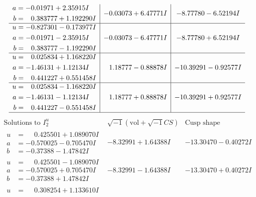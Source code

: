 \documentclass[1p]{elsarticle_modified}
\theoremstyle{definition}
\newcommand{\I}{\sqrt{-1}}
\begin{document}
$$\begin{array}{c|c|c}
\begin{aligned}
a &= -0.01971 + 2.35915 I \\
b &= \phantom{-}0.383777 + 1.192290 I\end{aligned}
 & -0.03073 + 6.47771 I & -8.77780 - 6.52194 I \\ \hline\begin{aligned}
u &= -0.827301 - 0.173977 I \\
a &= -0.01971 - 2.35915 I \\
b &= \phantom{-}0.383777 - 1.192290 I\end{aligned}
 & -0.03073 - 6.47771 I & -8.77780 + 6.52194 I \\ \hline\begin{aligned}
u &= \phantom{-}0.025834 + 1.168220 I \\
a &= -1.46131 + 1.12134 I \\
b &= \phantom{-}0.441227 + 0.551458 I\end{aligned}
 & \phantom{-}1.18777 - 0.88878 I & -10.39291 - 0.92577 I \\ \hline\begin{aligned}
u &= \phantom{-}0.025834 - 1.168220 I \\
a &= -1.46131 - 1.12134 I \\
b &= \phantom{-}0.441227 - 0.551458 I\end{aligned}
 & \phantom{-}1.18777 + 0.88878 I & -10.39291 + 0.92577 I\\
 \hline 
 \end{array}$$\newpage$$\begin{array}{c|c|c}  
\text{Solutions to }I^u_{2}& \I (\text{vol} + \sqrt{-1}CS) & \text{Cusp shape}\\
 \hline 
\begin{aligned}
u &= \phantom{-}0.425501 + 1.089070 I \\
a &= -0.570025 - 0.705470 I \\
b &= -0.37388 - 1.47842 I\end{aligned}
 & -8.32991 + 1.64388 I & -13.30470 - 0.40272 I \\ \hline\begin{aligned}
u &= \phantom{-}0.425501 - 1.089070 I \\
a &= -0.570025 + 0.705470 I \\
b &= -0.37388 + 1.47842 I\end{aligned}
 & -8.32991 - 1.64388 I & -13.30470 + 0.40272 I \\ \hline\begin{aligned}
u &= \phantom{-}0.308254 + 1.133610 I \\

\end{aligned}
\end{array}$$
\end{document}
